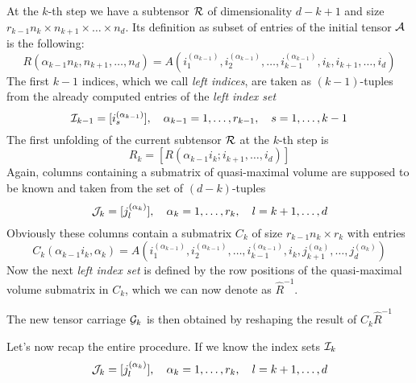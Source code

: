 At the $k$-th step we have a subtensor $\mathcal{R}$ of dimensionality $d-k+1$ and size $r_{k-1}n_k \times n_{k+1} \times \ldots \times n_d$. Its definition as subset of entries of the initial tensor $\mathcal{A}$ is the following:
\begin{equation*}
  R(\alpha_{k-1}n_k,n_{k+1},\ldots,n_d) = A(i_1^{(\alpha_{k-1})},i_2^{(\alpha_{k-1})},\ldots,i_{k-1}^{(\alpha_{k-1})},i_k,i_{k+1},\ldots,i_d)
\end{equation*}
The first $k-1$ indices, which we call \emph{left indices}, are taken as $(k-1)$-tuples from the already computed entries of the \emph{left index set} 
\begin{equation*}
  \mathcal{I}_{k-1} = [i_s^{(\alpha_{k-1})}],\quad \alpha_{k-1} = 1,\ldots,r_{k-1},\quad s = 1,\ldots,k-1
\end{equation*}
The first unfolding of the current subtensor $\mathcal{R}$ at the $k$-th step is
\begin{equation*}
  R_k = [R(\alpha_{k-1}i_k;i_{k+1},\ldots,i_d)]
\end{equation*}
Again, columns containing a submatrix of quasi-maximal volume are supposed to be known and taken from the set of $(d-k)$-tuples
\begin{equation*}
  \mathcal{J}_k = [j_l^{(\alpha_k)}],\quad \alpha_k = 1,\ldots,r_k,\quad l = k+1,\ldots,d
\end{equation*}
Obviously these columns contain a submatrix $C_k$ of size $r_{k-1}n_k \times r_k$ with entries
\begin{equation*}
  C_k(\alpha_{k-1}i_k,\alpha_k) = A(i_1^{(\alpha_{k-1})},i_2^{(\alpha_{k-1})},\ldots,i_{k-1}^{(\alpha_{k-1})},i_k,j_{k+1}^{(\alpha_k)},\ldots,j_d^{(\alpha_k)})
\end{equation*}
Now the next \emph{left index set} is defined by the row positions of the quasi-maximal volume submatrix in $C_k$, which we can now denote as $\hat{R}^{-1}$.

The new tensor carriage $\mathcal{G}_k$ is then obtained by reshaping the result of $C_k \hat{R}^{-1}$

Let's now recap the entire procedure. If we know the index sets $\mathcal{I}_k$
\begin{equation*}
  \mathcal{J}_k = [j_l^{(\alpha_k)}],\quad \alpha_k = 1,\ldots,r_k,\quad l = k+1,\ldots,d
\end{equation*}
